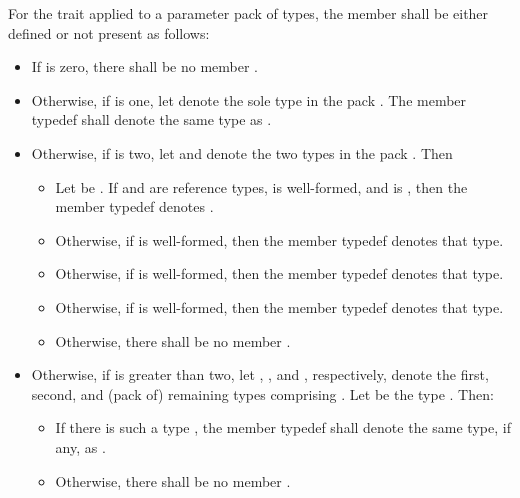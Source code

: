 \pnum
For the  trait applied to a parameter pack
 of types, the member  shall be either defined or not
present as follows:
\begin{itemize}
\item If  is zero, there shall be no member .

\item Otherwise, if  is one, let  denote the sole
  type in the pack . The member typedef  shall denote the
  same type as .

\item Otherwise, if  is two, let  and 
  denote the two types in the pack . Then
  \begin{itemize}
  \item Let  be .
    If  and  are reference types,
     is well-formed, and
     is ,
    then the member typedef  denotes .

  \item Otherwise, if
    is well-formed, then the member typedef  denotes that type.

  \item Otherwise, if  is well-formed,
    then the member typedef  denotes that type.

  \item Otherwise, if  is well-formed, then the
    member typedef  denotes that type.

  \item Otherwise, there shall be no member .
  \end{itemize}

\item Otherwise, if  is greater than two, let ,
  , and , respectively, denote the first, second, and
  (pack of) remaining types comprising . Let  be the type
  . Then:
  \begin{itemize}
  \item If there is such a type , the member typedef  shall
    denote the same type, if any, as .

  \item Otherwise, there shall be no member .
  \end{itemize}
\end{itemize}

